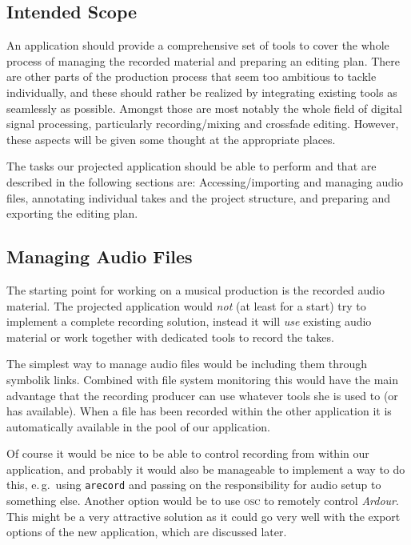 \documentclass[11pt,a4paper]{article}
\begin{document}
\subsection{Intended Scope}

An application should provide a comprehensive set of tools to cover the whole
process of managing the recorded material and preparing an editing plan.
There are other parts of the production process that seem too ambitious to
tackle individually, and these should rather be realized by integrating existing
tools as seamlessly as possible.
Amongst those are most notably the whole field of digital signal processing,
particularly recording/mixing and crossfade editing.
However, these aspects will be given some thought at the appropriate places.

The tasks our projected application should be able to perform and that are
described in the following sections are:
Accessing/importing and managing audio files,
annotating individual takes and the project structure, and
preparing and exporting the editing plan.

\subsection{Managing Audio Files}

The starting point for working on a musical production is the recorded audio
material.
The projected application would \emph{not} (at least for a start) try to
implement a complete recording solution, instead it will \emph{use} existing
audio material or work together with dedicated tools to record the takes.

The simplest way to manage audio files would be including them through symbolik links.
Combined with file system monitoring this would have the main advantage that the
recording producer can use whatever tools she is used to (or has available).
When a file has been recorded within the other application it is automatically
available in the pool of our application.

Of course it would be nice to be able to control recording from within our
application, and probably it would also be manageable to implement a way to do
this, e.\,g.\ using \texttt{arecord} and passing on the responsibility for audio
setup to something else.
Another option would be to use \textsc{osc} to remotely control \emph{Ardour}.
This might be a very attractive solution as it could go very well with the
export options of the new application, which are discussed later.
\end{document}
